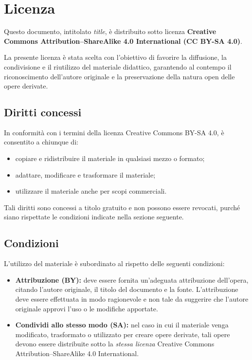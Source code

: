 \chapter*{Licenza}

\setlength{\parskip}{0.8em}
\setlength{\parindent}{0pt}

Questo documento, intitolato \emph{title},
è distribuito sotto licenza \textbf{Creative Commons Attribution--ShareAlike 4.0
International (CC BY-SA 4.0)}.

La presente licenza è stata scelta con l'obiettivo di favorire la diffusione,
la condivisione e il riutilizzo del materiale didattico, garantendo al contempo
il riconoscimento dell'autore originale e la preservazione della natura open
delle opere derivate.

\vspace{1em}

\section*{Diritti concessi}

In conformità con i termini della licenza Creative Commons BY-SA 4.0, è consentito
a chiunque di:
\begin{itemize}
  \item copiare e ridistribuire il materiale in qualsiasi mezzo o formato;
  \item adattare, modificare e trasformare il materiale;
  \item utilizzare il materiale anche per scopi commerciali.
\end{itemize}

Tali diritti sono concessi a titolo gratuito e non possono essere revocati,
purché siano rispettate le condizioni indicate nella sezione seguente.

\vspace{1em}

\section*{Condizioni}

L'utilizzo del materiale è subordinato al rispetto delle seguenti condizioni:

\begin{itemize}
  \item \textbf{Attribuzione (BY):} deve essere fornita un'adeguata attribuzione
  dell'opera, citando l'autore originale, il titolo del documento e la fonte.
  L'attribuzione deve essere effettuata in modo ragionevole e non tale da suggerire
  che l'autore originale approvi l'uso o le modifiche apportate.

  \item \textbf{Condividi allo stesso modo (SA):} nel caso in cui il materiale
  venga modificato, trasformato o utilizzato per creare opere derivate, tali opere
  devono essere distribuite sotto la \emph{stessa licenza} Creative Commons
  Attribution--ShareAlike 4.0 International.
\end{itemize}

